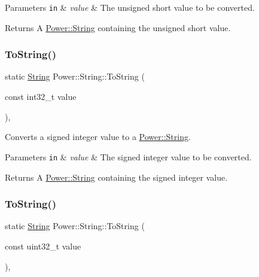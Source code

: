 \begin{DoxyParams}[1]{Parameters}
\mbox{\tt in}  & {\em value} & The unsigned short value to be converted. \\
\hline
\end{DoxyParams}
\begin{DoxyReturn}{Returns}
A \hyperlink{class_power_1_1_string}{Power\+::\+String} containing the unsigned short value. 
\end{DoxyReturn}
\mbox{\label{class_power_1_1_string_af88609c608f5996fb997553e5f141bc6}} 
\subsubsection{\texorpdfstring{To\+String()}{ToString()}\hspace{0.1cm}{\footnotesize\ttfamily [6/11]}}
{\footnotesize\ttfamily static \hyperlink{class_power_1_1_string}{String} Power\+::\+String\+::\+To\+String (\begin{DoxyParamCaption}\item[{const int32\+\_\+t}]{value }\end{DoxyParamCaption})\hspace{0.3cm}{\ttfamily [inline]}, {\ttfamily [static]}}



Converts a signed integer value to a \hyperlink{class_power_1_1_string}{Power\+::\+String}. 


\begin{DoxyParams}[1]{Parameters}
\mbox{\tt in}  & {\em value} & The signed integer value to be converted. \\
\hline
\end{DoxyParams}
\begin{DoxyReturn}{Returns}
A \hyperlink{class_power_1_1_string}{Power\+::\+String} containing the signed integer value. 
\end{DoxyReturn}
\mbox{\label{class_power_1_1_string_adc77cae195a8cf75e8353f2c3f1e3893}} 
\subsubsection{\texorpdfstring{To\+String()}{ToString()}\hspace{0.1cm}{\footnotesize\ttfamily [7/11]}}
{\footnotesize\ttfamily static \hyperlink{class_power_1_1_string}{String} Power\+::\+String\+::\+To\+String (\begin{DoxyParamCaption}\item[{const uint32\+\_\+t}]{value }\end{DoxyParamCaption})\hspace{0.3cm}{\ttfamily [inline]}, {\ttfamily [static]}}



